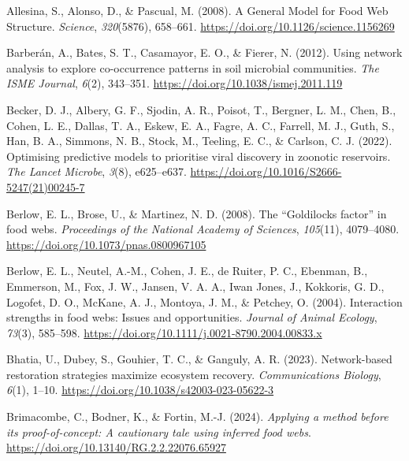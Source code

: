 \documentclass[
]{article}
\newlength{\cslhangindent}
\newenvironment{CSLReferences}[2] %
 {\begin{list}{}{%
  \setlength{\itemindent}{0pt}
  \setlength{\leftmargin}{0pt}
  \setlength{\parsep}{0pt}
  \ifodd #1
   \setlength{\leftmargin}{\cslhangindent}
   \setlength{\itemindent}{-1\cslhangindent}
  \fi
  \setlength{\itemsep}{#2\baselineskip}}}
 {\end{list}}
\begin{document}
\label{refs}
\begin{CSLReferences}{1}{0}
Allesina, S., Alonso, D., \& Pascual, M. (2008). A {General Model} for
{Food Web Structure}. \emph{Science}, \emph{320}(5876), 658--661.
\url{https://doi.org/10.1126/science.1156269}

Barberán, A., Bates, S. T., Casamayor, E. O., \& Fierer, N. (2012).
Using network analysis to explore co-occurrence patterns in soil
microbial communities. \emph{The ISME Journal}, \emph{6}(2), 343--351.
\url{https://doi.org/10.1038/ismej.2011.119}

Becker, D. J., Albery, G. F., Sjodin, A. R., Poisot, T., Bergner, L. M.,
Chen, B., Cohen, L. E., Dallas, T. A., Eskew, E. A., Fagre, A. C.,
Farrell, M. J., Guth, S., Han, B. A., Simmons, N. B., Stock, M.,
Teeling, E. C., \& Carlson, C. J. (2022). Optimising predictive models
to prioritise viral discovery in zoonotic reservoirs. \emph{The Lancet
Microbe}, \emph{3}(8), e625--e637.
\url{https://doi.org/10.1016/S2666-5247(21)00245-7}

Berlow, E. L., Brose, U., \& Martinez, N. D. (2008). The {``{Goldilocks}
factor''} in food webs. \emph{Proceedings of the National Academy of
Sciences}, \emph{105}(11), 4079--4080.
\url{https://doi.org/10.1073/pnas.0800967105}

Berlow, E. L., Neutel, A.-M., Cohen, J. E., de Ruiter, P. C., Ebenman,
B., Emmerson, M., Fox, J. W., Jansen, V. A. A., Iwan Jones, J.,
Kokkoris, G. D., Logofet, D. O., McKane, A. J., Montoya, J. M., \&
Petchey, O. (2004). Interaction strengths in food webs: Issues and
opportunities. \emph{Journal of Animal Ecology}, \emph{73}(3), 585--598.
\url{https://doi.org/10.1111/j.0021-8790.2004.00833.x}

Bhatia, U., Dubey, S., Gouhier, T. C., \& Ganguly, A. R. (2023).
Network-based restoration strategies maximize ecosystem recovery.
\emph{Communications Biology}, \emph{6}(1), 1--10.
\url{https://doi.org/10.1038/s42003-023-05622-3}

Brimacombe, C., Bodner, K., \& Fortin, M.-J. (2024). \emph{Applying a
method before its proof-of-concept: {A} cautionary tale using inferred
food webs}. \url{https://doi.org/10.13140/RG.2.2.22076.65927}


\end{CSLReferences}
\end{document}
